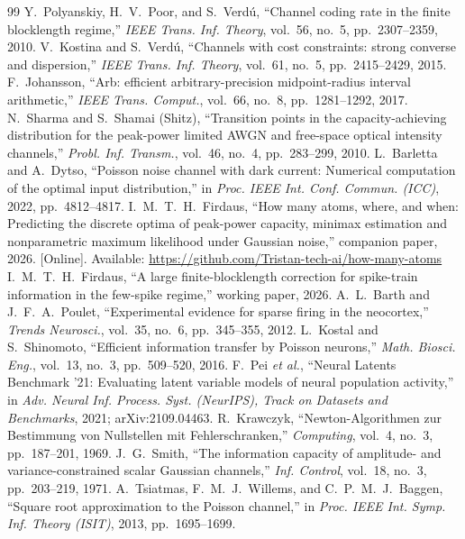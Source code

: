\documentclass[journal]{IEEEtran}
\begin{document}
\begin{thebibliography}{99}
 Y.~Polyanskiy, H.~V.~Poor, and S.~Verd\'u, ``Channel coding rate in the finite blocklength regime,'' \emph{IEEE Trans. Inf. Theory}, vol.~56, no.~5, pp.~2307--2359, 2010.%
 V.~Kostina and S.~Verd\'u, ``Channels with cost constraints: strong converse and dispersion,'' \emph{IEEE Trans. Inf. Theory}, vol.~61, no.~5, pp.~2415--2429, 2015.
 F.~Johansson, ``Arb: efficient arbitrary-precision midpoint-radius interval arithmetic,'' \emph{IEEE Trans. Comput.}, vol.~66, no.~8, pp.~1281--1292, 2017.
 N.~Sharma and S.~Shamai (Shitz), ``Transition points in the capacity-achieving distribution for the peak-power limited AWGN and free-space optical intensity channels,'' \emph{Probl. Inf. Transm.}, vol.~46, no.~4, pp.~283--299, 2010.
 L.~Barletta and A.~Dytso, ``Poisson noise channel with dark current: Numerical computation of the optimal input distribution,'' in \emph{Proc. IEEE Int. Conf. Commun. (ICC)}, 2022, pp.~4812--4817.
 I.~M.~T.~H.~Firdaus, ``How many atoms, where, and when: Predicting the discrete optima of peak-power capacity, minimax estimation and nonparametric maximum likelihood under Gaussian noise,'' companion paper, 2026. [Online]. Available: \url{https://github.com/Tristan-tech-ai/how-many-atoms}
 I.~M.~T.~H.~Firdaus, ``A large finite-blocklength correction for spike-train information in the few-spike regime,'' working paper, 2026.
 A.~L.~Barth and J.~F.~A.~Poulet, ``Experimental evidence for sparse firing in the neocortex,'' \emph{Trends Neurosci.}, vol.~35, no.~6, pp.~345--355, 2012.%
 L.~Kostal and S.~Shinomoto, ``Efficient information transfer by Poisson neurons,'' \emph{Math. Biosci. Eng.}, vol.~13, no.~3, pp.~509--520, 2016.
 F.~Pei \emph{et al.}, ``Neural Latents Benchmark '21: Evaluating latent variable models of neural population activity,'' in \emph{Adv. Neural Inf. Process. Syst. (NeurIPS), Track on Datasets and Benchmarks}, 2021; arXiv:2109.04463.
 R.~Krawczyk, ``Newton-Algorithmen zur Bestimmung von Nullstellen mit Fehlerschranken,'' \emph{Computing}, vol.~4, no.~3, pp.~187--201, 1969.
 J.~G.~Smith, ``The information capacity of amplitude- and variance-constrained scalar Gaussian channels,'' \emph{Inf. Control}, vol.~18, no.~3, pp.~203--219, 1971.
 A.~Tsiatmas, F.~M.~J.~Willems, and C.~P.~M.~J.~Baggen, ``Square root approximation to the Poisson channel,'' in \emph{Proc. IEEE Int. Symp. Inf. Theory (ISIT)}, 2013, pp.~1695--1699.

\end{thebibliography}
\end{document}
